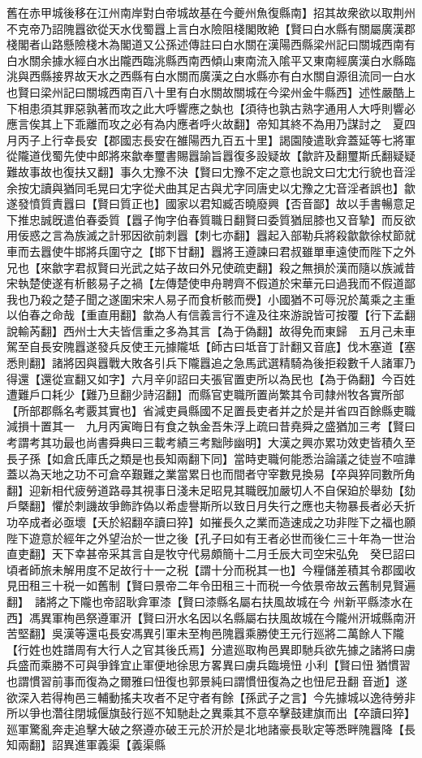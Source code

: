 舊在赤甲城後移在江州南岸對白帝城故基在今夔州魚復縣南】招其故衆欲以取荆州不克帝乃詔隗囂欲從天水伐蜀囂上言白水險阻棧閣敗絶【賢曰白水縣有關屬廣漢郡棧閣者山路懸險棧木為閣道又公孫述傳註曰白水關在漢陽西縣梁州記曰關城西南有白水關余據水經白水出隴西臨洮縣西南西傾山東南流入隂平又東南經廣漢白水縣臨洮與西縣接界故天水之西縣有白水關而廣漢之白水縣亦有白水關自源徂流同一白水也賢曰梁州記曰關城西南百八十里有白水關故關城在今梁州金牛縣西】述性嚴酷上下相患須其罪惡孰著而攻之此大呼響應之埶也【須待也孰古熟字通用人大呼則響必應言俟其上下乖離而攻之必有為内應者呼火故翻】帝知其終不為用乃謀討之　夏四月丙子上行幸長安【郡國志長安在雒陽西九百五十里】謁園陵遣耿弇蓋延等七將軍從隴道伐蜀先使中郎將來歙奉璽書賜囂諭旨囂復多設疑故【歙許及翻璽斯氏翻疑疑難故事故也復扶又翻】事久冘豫不決【賢曰冘豫不定之意也說文曰冘冘行貌也音淫余按冘讀與猶同毛晃曰冘字從犬曲其足古與尤字同唐史以冘豫之冘音淫者誤也】歙遂發憤質責囂曰【賢曰質正也】國家以君知臧否曉廢興【否音鄙】故以手書暢意足下推忠誠旣遣伯春委質【囂子恂字伯春質職日翻賢曰委質猶屈膝也又音摯】而反欲用佞惑之言為族滅之計邪因欲前刺囂【刺七亦翻】囂起入部勒兵將殺歙歙徐杖節就車而去囂使牛邯將兵圍守之【邯下甘翻】囂將王遵諫曰君叔雖單車遠使而陛下之外兄也【來歙字君叔賢曰光武之姑子故曰外兄使疏吏翻】殺之無損於漢而隨以族滅昔宋執楚使遂有析骸易子之禍【左傳楚使申舟聘齊不假道於宋華元曰過我而不假道鄙我也乃殺之楚子聞之遂圍宋宋人易子而食析骸而㸑】小國猶不可辱況於萬乘之主重以伯春之命哉【重直用翻】歙為人有信義言行不違及往來游說皆可按覆【行下孟翻說輸芮翻】西州士大夫皆信重之多為其言【為于偽翻】故得免而東歸　五月己未車駕至自長安隗囂遂發兵反使王元據隴坻【師古曰坻音丁計翻又音底】伐木塞道【塞悉則翻】諸將因與囂戰大敗各引兵下隴囂追之急馬武選精騎為後拒殺數千人諸軍乃得還【還從宣翻又如字】六月辛卯詔曰夫張官置吏所以為民也【為于偽翻】今百姓遭難戶口耗少【難乃旦翻少詩沼翻】而縣官吏職所置尚繁其令司隸州牧各實所部【所部郡縣名考覈其實也】省減吏員縣國不足置長吏者并之於是并省四百餘縣吏職減損十置其一　九月丙寅晦日有食之執金吾朱浮上疏曰昔堯舜之盛猶加三考【賢曰考謂考其功最也尚書舜典曰三載考績三考黜陟幽明】大漢之興亦累功效吏皆積久至長子孫【如倉氏庫氏之類是也長知兩翻下同】當時吏職何能悉治論議之徒豈不喧譁蓋以為天地之功不可倉卒艱難之業當累日也而間者守宰數見換易【卒與猝同數所角翻】迎新相代疲勞道路尋其視事日淺未足昭見其職旣加嚴切人不自保廹於舉劾【劾戶槩翻】懼於刺譏故爭飾詐偽以希虚譽斯所以致日月失行之應也夫物暴長者必夭折功卒成者必亟壞【夭於紹翻卒讀曰猝】如摧長久之業而造速成之功非陛下之福也願陛下遊意於經年之外望治於一世之後【孔子曰如有王者必世而後仁三十年為一世治直吏翻】天下幸甚帝采其言自是牧守代易頗簡十二月壬辰大司空宋弘免　癸巳詔曰頃者師旅未解用度不足故行十一之税【謂十分而税其一也】今糧儲差積其令郡國收見田租三十税一如舊制【賢曰景帝二年令田租三十而税一今依景帝故云舊制見賢遍翻】　諸將之下隴也帝詔耿弇軍漆【賢曰漆縣名屬右扶風故城在今州新平縣漆水在西】馮異軍栒邑祭遵軍汧【賢曰汧水名因以名縣屬右扶風故城在今隴州汧城縣南汧苦堅翻】吳漢等還屯長安馮異引軍未至栒邑隗囂乘勝使王元行廵將二萬餘人下隴【行姓也姓譜周有大行人之官其後氏焉】分遣廵取栒邑異即馳兵欲先據之諸將曰虜兵盛而乘勝不可與爭鋒宜止軍便地徐思方畧異曰虜兵臨境忸小利【賢曰忸猶慣習也謂慣習前事而復為之爾雅曰忸復也郭景純曰謂慣忸復為之也忸尼丑翻音逝】遂欲深入若得栒邑三輔動搖夫攻者不足守者有餘【孫武子之言】今先據城以逸待勞非所以爭也濳往閉城偃旗鼔行廵不知馳赴之異乘其不意卒擊鼓建旗而出【卒讀曰猝】廵軍驚亂奔走追擊大破之祭遵亦破王元於汧於是北地諸豪長耿定等悉畔隗囂降【長知兩翻】詔異進軍義渠【義渠縣